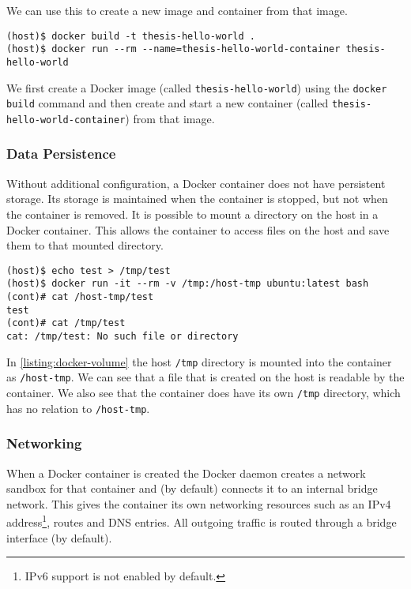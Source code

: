 We can use this to create a new image and container from that image.
\begin{lstlisting}[caption={Creating a Docker container from a \lstinline{Dockerfile}.},label={listing:create-container},captionpos=b]
(host)$ docker build -t thesis-hello-world .
(host)$ docker run --rm --name=thesis-hello-world-container thesis-hello-world
\end{lstlisting}

We first create a Docker image (called \lstinline{thesis-hello-world}) using the \lstinline{docker build} command and then create and start a new container (called \lstinline{thesis-hello-world-container}) from that image.

\subsubsection{Data Persistence}\label{subsection:data-persistence}
Without additional configuration, a Docker container does not have persistent storage. Its storage is maintained when the container is stopped, but not when the container is removed. It is possible to mount a directory on the host in a Docker container. This allows the container to access files on the host and save them to that mounted directory.

\begin{lstlisting}[caption={Bind mount example.},label={listing:docker-volume},captionpos=b]
(host)$ echo test > /tmp/test
(host)$ docker run -it --rm -v /tmp:/host-tmp ubuntu:latest bash
(cont)# cat /host-tmp/test
test
(cont)# cat /tmp/test
cat: /tmp/test: No such file or directory
\end{lstlisting}

In \autoref{listing:docker-volume} the host \lstinline{/tmp} directory is mounted into the container as \lstinline{/host-tmp}. We can see that a file that is created on the host is readable by the container. We also see that the container does have its own \lstinline{/tmp} directory, which has no relation to \lstinline{/host-tmp}.

\subsubsection{Networking}
When a Docker container is created the Docker daemon creates a network sandbox for that container and (by default) connects it to an internal bridge network. This gives the container its own networking resources such as an IPv4 address\footnote{IPv6 support is not enabled by default.}, routes and DNS entries. All outgoing traffic is routed through a bridge interface (by default).

